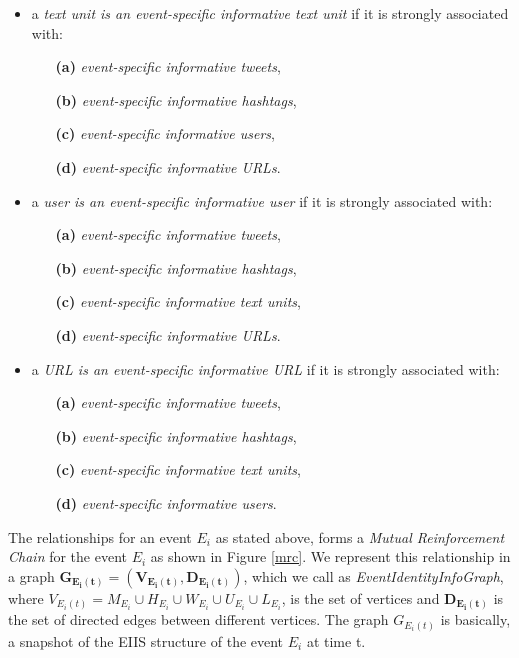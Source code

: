 \begin{itemize} 
\item a \textit{text unit is an event-specific informative text unit} if it is strongly associated with:
\begin{itemize}
\item[\textbf{(a)}] \textit{event-specific informative tweets}, 
\item[\textbf{(b)}] \textit{event-specific informative hashtags}, 
\item[\textbf{(c)}] \textit{event-specific informative users}, 
\item[\textbf{(d)}] \textit{event-specific informative URLs}. 
\end{itemize}
\end{itemize}

\begin{itemize} 
\item a \textit{user is an event-specific informative user} if it is strongly associated with:
\begin{itemize}
\item[\textbf{(a)}] \textit{event-specific informative tweets}, 
\item[\textbf{(b)}] \textit{event-specific informative hashtags}, 
\item[\textbf{(c)}] \textit{event-specific informative text units},
\item[\textbf{(d)}] \textit{event-specific informative URLs}. 
\end{itemize}
\end{itemize}

\begin{itemize} \item a \textit{URL is an event-specific informative URL} if it is strongly associated with:
\begin{itemize}
\item[\textbf{(a)}] \textit{event-specific informative tweets}, 
\item[\textbf{(b)}] \textit{event-specific informative hashtags}, 
\item[\textbf{(c)}] \textit{event-specific informative text units},
\item[\textbf{(d)}] \textit{event-specific informative users}. 
\end{itemize}
\end{itemize}


The relationships for an event $E_{i}$ as stated above, forms a \textit{Mutual Reinforcement Chain} \cite{wei2008query} for the event $E_{i}$ as shown in Figure \ref{mrc}. We represent this relationship in a graph $\mathbf{G_{E_{i}(t)} = (V_{E_{i}(t)},D_{E_{i}(t)})}$, which we call as \textit{EventIdentityInfoGraph}, where $V_{E_{i}(t)} = M_{E_{i}} \cup H_{E_{i}} \cup W_{E_{i}} \cup U_{E_{i}} \cup L_{E_{i}}$, is the set of vertices and $\mathbf{D_{E_{i}(t)}}$ is the set of directed edges between different vertices. The graph $G_{E_{i}(t)}$ is basically, a snapshot of the EIIS structure of the event $E_{i}$ at time t. 

